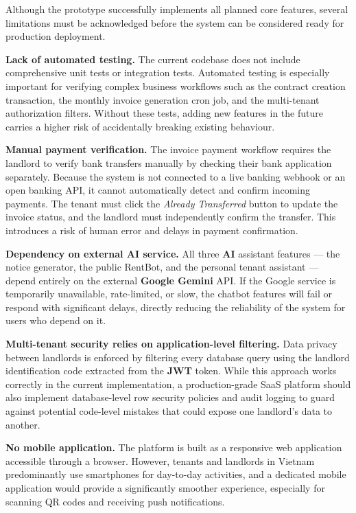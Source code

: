 Although the prototype successfully implements all planned core features, several limitations must be acknowledged before the system can be considered ready for production deployment.

\textbf{Lack of automated testing.} The current codebase does not include comprehensive unit tests or integration tests. Automated testing is especially important for verifying complex business workflows such as the contract creation transaction, the monthly invoice generation cron job, and the multi-tenant authorization filters. Without these tests, adding new features in the future carries a higher risk of accidentally breaking existing behaviour.

\textbf{Manual payment verification.} The invoice payment workflow requires the landlord to verify bank transfers manually by checking their bank application separately. Because the system is not connected to a live banking webhook or an open banking API, it cannot automatically detect and confirm incoming payments. The tenant must click the \textit{Already Transferred} button to update the invoice status, and the landlord must independently confirm the transfer. This introduces a risk of human error and delays in payment confirmation.

\textbf{Dependency on external AI service.} All three \textbf{AI} assistant features — the notice generator, the public RentBot, and the personal tenant assistant — depend entirely on the external \textbf{Google Gemini} API. If the Google service is temporarily unavailable, rate-limited, or slow, the chatbot features will fail or respond with significant delays, directly reducing the reliability of the system for users who depend on it.

\textbf{Multi-tenant security relies on application-level filtering.} Data privacy between landlords is enforced by filtering every database query using the landlord identification code extracted from the \textbf{JWT} token. While this approach works correctly in the current implementation, a production-grade SaaS platform should also implement database-level row security policies and audit logging to guard against potential code-level mistakes that could expose one landlord's data to another.

\textbf{No mobile application.} The platform is built as a responsive web application accessible through a browser. However, tenants and landlords in Vietnam predominantly use smartphones for day-to-day activities, and a dedicated mobile application would provide a significantly smoother experience, especially for scanning QR codes and receiving push notifications.

